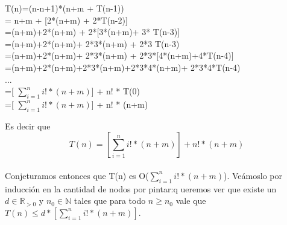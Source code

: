 \begin{centering}
T(n)=(n-n+1)*(n+m + T(n-1))\\
= n+m + [2*(n+m) + 2*T(n-2)]\\
=(n+m)+2*(n+m) + 2*[3*(n+m)+ 3* T(n-3)]\\
=(n+m)+2*(n+m)+ 2*3*(n+m) + 2*3 T(n-3)\\
=(n+m)+2*(n+m)+ 2*3*(n+m) + 2*3*[4*(n+m)+4*T(n-4)]\\
=(n+m)+2*(n+m)+2*3*(n+m)+2*3*4*(n+m)+ 2*3*4*T(n-4)\\
...\\
=[ $\sum_{i=1}^{n} i! * (n+m) $] + n! * T(0) \\
=[ $\sum_{i=1}^{n} i! * (n+m) $] + n! * (n+m)\\
\end{centering}

\indent Es decir que $$T(n)= \left[ \sum_{i=1}^{n} i! * (n+m) \right] + n! * (n+m)$$\\

Conjeturamos entonces que T(n) es O($\sum_{i=1}^{n} i! * (n+m) $).
Veámoslo por inducción en la cantidad de nodos por pintar:q ueremos ver que existe un $d \in \mathbb{R}_{> 0}$ y $n_{0}  \in \mathbb{N}$ tales que para todo $n \geq n_{0}$ vale que $T(n) \leq d * [\sum_{i=1}^{n} i! * (n+m)] $.

